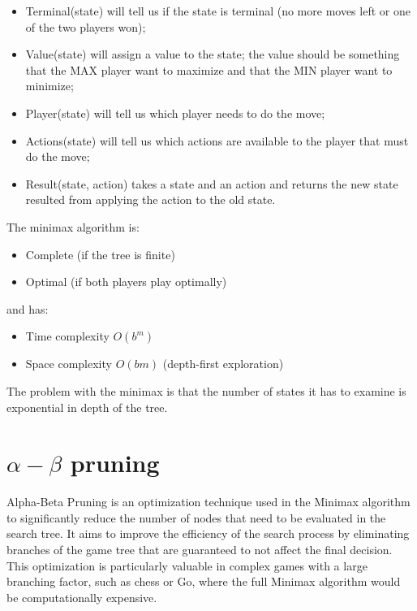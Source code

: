 \documentclass{article}
\begin{document}
\begin{itemize}
    \item Terminal(state) will tell us if the state is terminal (no more moves left or one of the two players won);
    \item Value(state) will assign a value to the state; the value should be something that the MAX player want to maximize and that the MIN player want to minimize;
    \item Player(state) will tell us which player needs to do the move;
    \item Actions(state) will tell us which actions are available to the player that must do the move;
    \item Result(state, action) takes a state and an action and returns the new state resulted from applying the action to the old state. 
\end{itemize}

The minimax algorithm is:

\begin{itemize}
    \item Complete (if the tree is finite)
    \item Optimal (if both players play optimally)
\end{itemize}

and has:

\begin{itemize}
    \item Time complexity $O(b^m)$
    \item Space complexity $O(bm)$ (depth-first exploration)
\end{itemize}

The problem with the minimax is that the number of states it has to examine is exponential in depth of the tree.

\newpage

\section{$\alpha-\beta$ pruning}

Alpha-Beta Pruning is an optimization technique used in the Minimax algorithm to significantly reduce the number of nodes that need to be evaluated in the search tree. It aims to improve the efficiency of the search process by eliminating branches of the game tree that are guaranteed to not affect the final decision. This optimization is particularly valuable in complex games with a large branching factor, such as chess or Go, where the full Minimax algorithm would be computationally expensive.
\end{document}
